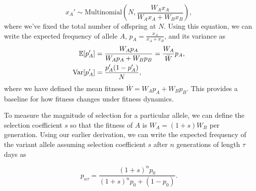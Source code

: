 \begin{equation}
x_A' \sim \text{Multinomial}\left(N, \frac{W_A x_A}{W_A x_A + W_B x_B}\right),
\end{equation}
where we've fixed the total number of offspring at $N$.
Using this equation, we can write the expected frequency of allele $A$, $p_A = \frac{x_A}{x_A + x_B}$, and its variance as
\begin{align}
  \mathbb{E}[p_A'] &= \frac{W_A p_A }{W_A p_A + W_B p_B} = \frac{W_A}{\bar{W}}p_A,\\
  \text{Var}[p_A'] &= \frac{p_A' (1 - p_A')}{N} \label{eq:allele_variance},
\end{align}
where we have defined the mean fitness $\bar{W} = W_A p_A + W_B p_B$.
This provides a baseline for how fitness changes under fitness dynamics.

To measure the magnitude of selection for a particular allele, we can define the selection coefficient $s$ so that the fitness of $A$ is $W_A = (1+s) W_B$ per generation.
Using our earlier derivation, we can write the expected frequency of the variant allele assuming selection coefficient $s$ after $n$ generations of length $\tau$ days as

\begin{equation}
p_{n\tau} = \frac{(1+s)^{n}p_{0}}{(1+s)^{n}p_{0} + (1 - p_0)}.
\end{equation}

%
%
%
%

